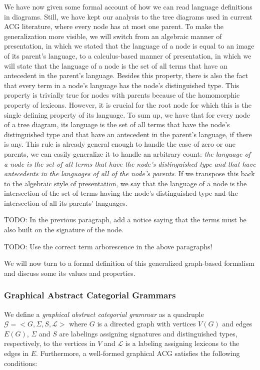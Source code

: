 We have now given some formal account of how we can read language
definitions in diagrams. Still, we have kept our analysis to the tree
diagrams used in current ACG literature, where every node has at most
one parent. To make the generalization more visible, we will switch from
an algebraic manner of presentation, in which we stated that the
language of a node is equal to an image of its parent's language, to a
calculus-based manner of presentation, in which we will state that the
language of a node is the set of all terms that have an antecedent in
the parent's language. Besides this property, there is also the fact
that every term in a node's language has the node's distinguished
type. This property is trivially true for nodes with parents because of
the homomorphic property of lexicons. However, it is crucial for the
root node for which this is the single defining property of its
language. To sum up, we have that for every node of a tree diagram, its
language is the set of all terms that have the node's distinguished type
and that have an antecedent in the parent's language, if there is
any. This rule is already general enough to handle the case of zero or
one parents, we can easily generalize it to handle an arbitrary count:
\emph{the language of a node is the set of all terms that have the
  node's distinguished type and that have antecedents in the languages
  of all of the node's parents}. If we transpose this back to the
algebraic style of presentation, we say that the language of a node is
the intersection of the set of terms having the node's distinguished
type and the intersection of all its parents' languages.

TODO: In the previous paragraph, add a notice saying that the terms must
be also built on the signature of the node.

TODO: Use the correct term arborescence in the above paragraphs!

We will now turn to a formal definition of this generalized graph-based
formalism and discuss some its values and properties.

\subsubsection{Graphical Abstract Categorial Grammars}

We define a \emph{graphical abstract categorial grammar} as a quadruple
$\mathcal{G} = \mathopen{<} G, \Sigma, S, {\mathcal{L}} \mathclose{>}$
where $G$ is a directed graph with vertices $V(G)$ and edges $E(G)$,
$\Sigma$ and $S$ are labelings assigning signatures and distinguished
types, respectively, to the vertices in $V$ and ${\mathcal{L}}$ is a
labeling assigning lexicons to the edges in $E$. Furthermore, a
well-formed graphical ACG satisfies the following conditions:

